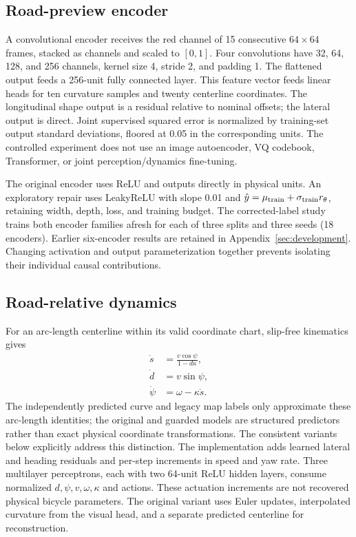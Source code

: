 \documentclass[preprint,12pt]{elsarticle}
\begin{document}
\subsection{Road-preview encoder}\label{sec:repr_learning}\label{sec:encoding}
A convolutional encoder receives the red channel of 15 consecutive $64\times64$
frames, stacked as channels and scaled to $[0,1]$. Four convolutions have
32, 64, 128, and 256 channels, kernel size 4, stride 2, and padding 1. The
flattened output feeds a 256-unit fully connected layer. This feature
vector feeds linear heads for ten curvature samples and twenty centerline
coordinates. The longitudinal shape output is a residual relative to nominal
offsets; the lateral output is direct. Joint supervised squared error is
normalized by training-set output standard deviations, floored at 0.05 in the
corresponding units. The controlled experiment does not use an image autoencoder,
VQ codebook, Transformer, or joint perception/dynamics fine-tuning.

The original encoder uses ReLU and outputs directly in physical units.
An exploratory repair uses LeakyReLU with slope 0.01 and
$\hat y=\mu_{\rm train}+\sigma_{\rm train}r_\theta$, retaining width, depth,
loss, and training budget. The corrected-label study trains both encoder families afresh for each of
three splits and three seeds (18 encoders). Earlier six-encoder results are
retained in Appendix~\ref{sec:development}.
Changing activation and output parameterization together prevents isolating
their individual causal contributions.

\subsection{Road-relative dynamics}\label{sec:prediction}
For an arc-length centerline within its valid coordinate chart, slip-free
kinematics gives
\begin{align}
 \dot s&=\frac{v\cos\psi}{1-d\kappa},\label{eq:frenet_s}\\
 \dot d&=v\sin\psi,\label{eq:frenet_d}\\
 \dot\psi&=\omega-\kappa\dot s.\label{eq:frenet_psi}
\end{align}
The independently predicted curve and legacy map labels only approximate
these arc-length identities; the original and guarded models are structured
predictors rather than exact physical coordinate transformations. The
consistent variants below explicitly address this distinction.
The implementation adds learned lateral and heading residuals and per-step
increments in speed and yaw rate. Three multilayer perceptrons, each with two 64-unit ReLU hidden layers, consume
normalized $d,\psi,v,\omega,\kappa$ and actions. These actuation increments are
not recovered physical bicycle parameters. The original variant uses Euler
updates, interpolated curvature from the visual head, and a separate predicted
centerline for reconstruction.
\end{document}
